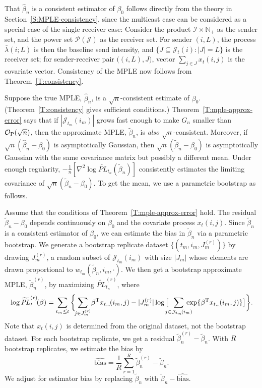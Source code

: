 \documentclass[final]{statsoc}
\begin{document}
That $\hat \beta_n$ is a consistent estimator of
$\beta_0$ follows directly from the theory in Section~\ref{S:MPLE-consistency},
since the multicast case can be considered as a special case of
the single receiver case:  Consider the product $\mathcal{I} \times \mathbb{N}_+$
as the sender set, and the power set $\mathcal{P}(\mathcal{J})$ as the
receiver set.  For sender $(i,L)$, the process $\bar \lambda(i ; L)$ is then the
baseline send intensity, and $\{ J \subseteq \mathcal{J}_t(i) : |J| = L\}$ is the receiver set; for
sender-receiver pair $\big((i,L), J\big)$, vector $\sum_{j \in J} x_t(i,j)$ is
the covariate vector.  Consistency of the MPLE now follows from
Theorem~\ref{T:consistency}.



Suppose the true MPLE, $\hat \beta_n$, is a $\sqrt{n}$-consistent estimate of
$\beta_0$. (Theorem~\ref{T:consistency} gives sufficient conditions.)
Theorem~\ref{T:mple-approx-error} says that if
$|\mathcal{J}_{t_m}(i_m)|$ grows fast enough to make $G_n$ smaller than
$\mathcal{O}_\text{P}(\sqrt{n})$, then the approximate MPLE, $\tilde \beta_n$, is \emph{also}
$\sqrt{n}$-consistent.
Moreover, if $\sqrt{n}(\hat \beta_n - \beta_0)$ is asymptotically Gaussian,
then $\sqrt{n}(\tilde \beta_n - \beta_0)$ is asymptotically Gaussian with
the same covariance matrix but possibly a different mean.
Under enough regularity,
\(
    -\tfrac{1}{n} [
        \nabla^2 \log \widetilde{\mathit{PL}}_{t_n}(\tilde \beta_n)
    ]
\)
consistently estimates the limiting covariance
of $\sqrt{n}(\tilde \beta_n - \beta_0)$.  To get the mean, we use
a parametric bootstrap as follows.

Assume that the conditions of Theorem~\ref{T:mple-approx-error} hold.
The residual $\tilde \beta_n - \beta_0$ depends continuously on $\beta_0$
and the covariate process $x_t(i,j)$.  Since $\tilde \beta_n$ is a consistent
estimator of $\beta_0$, we can estimate the bias in $\tilde \beta_n$ via
a parametric bootstrap.  We generate a bootstrap replicate dataset
$\{ (t_m, i_m, J_m^{(r)}) \}$ by drawing $J_m^{(r)}$, a random subset
of $\mathcal{J}_{t_m}(i_m)$ with size $|J_m|$ whose elements are drawn
proportional to $w_{t_m}(\tilde \beta_n, i_m, \cdot)$.
We then get a bootstrap approximate MPLE, $\tilde \beta_n^{(r)}$, by
maximizing $\widetilde{\mathit{PL}}_{t_n}^{(r)}$, where
\[
    \log \widetilde{\mathit{PL}}_{t}^{(r)}\!(\beta) \\
        =
        \sum_{t_m \leq t}
        \bigg\{\!\!
            \sum_{j \in J_m^{(r)}}\!
                \beta^\trans x_{t_m}\!(i_m, j)
            -
            |J_m^{(r)}|\log\big[
                \!\!\!\!
                \sum_{j \in \mathcal{J}_{t_m}\!(i_m)}\!\!\!\!\!\!
                    \exp\{ \beta^\trans x_{t_m}\!(i_m, j)\}
            \big]
        \bigg\}.
\]
Note that $x_t(i,j)$ is determined from the original dataset, not the
bootstrap dataset.  For each bootstrap replicate, we get a residual
$\tilde \beta_n^{(r)} - \tilde \beta_n$.  With $R$ bootstrap
replicates, we estimate the bias by
\[
    \widehat{\mathrm{bias}}
        =
            \frac{1}{R} \sum_{r=1}^{R} \tilde \beta_n^{(r)} - \tilde \beta_n.
\]
We adjust for estimator bias by replacing $\tilde \beta_n$ with
$\tilde \beta_n - \widehat{\mathrm{bias}}$.
\end{document}

